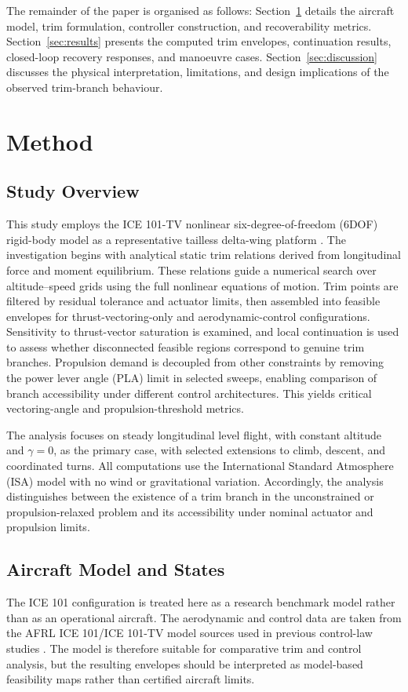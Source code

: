 \documentclass[conf]{new-aiaa}
\begin{document}
The remainder of the paper is organised as follows: Section~\ref{sec:method} details the aircraft model, trim formulation, controller construction, and recoverability metrics. Section~\ref{sec:results} presents the computed trim envelopes, continuation results, closed-loop recovery responses, and manoeuvre cases. Section~\ref{sec:discussion} discusses the physical interpretation, limitations, and design implications of the observed trim-branch behaviour.

\section{Method}\label{sec:method}

\subsection{Study Overview}
This study employs the ICE 101-TV nonlinear six-degree-of-freedom (6DOF) rigid-body model as a representative tailless delta-wing platform \cite{Gillard1998,Buffington1999}. The investigation begins with analytical static trim relations derived from longitudinal force and moment equilibrium. These relations guide a numerical search over altitude--speed grids using the full nonlinear equations of motion. Trim points are filtered by residual tolerance and actuator limits, then assembled into feasible envelopes for thrust-vectoring-only and aerodynamic-control configurations. Sensitivity to thrust-vector saturation is examined, and local continuation is used to assess whether disconnected feasible regions correspond to genuine trim branches. Propulsion demand is decoupled from other constraints by removing the power lever angle (PLA) limit in selected sweeps, enabling comparison of branch accessibility under different control architectures. This yields critical vectoring-angle and propulsion-threshold metrics.

The analysis focuses on steady longitudinal level flight, with constant altitude and $\gamma=0$, as the primary case, with selected extensions to climb, descent, and coordinated turns. All computations use the International Standard Atmosphere (ISA) model with no wind or gravitational variation. Accordingly, the analysis distinguishes between the existence of a trim branch in the unconstrained or propulsion-relaxed problem and its accessibility under nominal actuator and propulsion limits.

\subsection{Aircraft Model and States}
The ICE 101 configuration is treated here as a research benchmark model rather than as an operational aircraft. The aerodynamic and control data are taken from the AFRL ICE 101/ICE 101-TV model sources used in previous control-law studies \cite{Gillard1998,Buffington1999,JonesLowenbergRichardson2004}. The model is therefore suitable for comparative trim and control analysis, but the resulting envelopes should be interpreted as model-based feasibility maps rather than certified aircraft limits.
\end{document}
